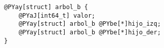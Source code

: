 \begin{Verbatim}[commandchars=@\[\]]
@PYay[struct] arbol_b {
    @PYaJ[int64_t] valor;
    @PYay[struct] arbol_b @PYbe[*]hijo_izq;
    @PYay[struct] arbol_b @PYbe[*]hijo_der;
}
\end{Verbatim}
